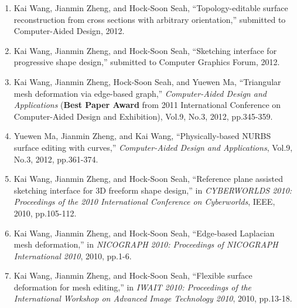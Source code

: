 \begin{enumerate}

\item Kai Wang, Jianmin Zheng, and Hock-Soon Seah,
``Topology-editable surface reconstruction from cross sections with
arbitrary orientation,'' submitted to Computer-Aided Design, 2012.

\item Kai Wang, Jianmin Zheng, and Hock-Soon Seah,
``Sketching interface for progressive shape design,'' submitted to
Computer Graphics Forum, 2012.

\item Kai Wang, Jianmin Zheng, Hock-Soon Seah, and Yuewen
Ma, ``Triangular mesh deformation via edge-based graph,''
\emph{Computer-Aided Design and Applications} ({\bf Best Paper
Award} from 2011 International Conference on Computer-Aided Design
and Exhibition), Vol.9, No.3, 2012, pp.345-359.

\item Yuewen Ma, Jianmin Zheng, and Kai Wang,
``Physically-based NURBS surface editing with curves,''
\emph{Computer-Aided Design and Applications}, Vol.9, No.3, 2012,
pp.361-374.

\item Kai Wang, Jianmin Zheng, and Hock-Soon Seah,
``Reference plane assisted sketching interface for 3D freeform shape
design,'' in \emph{CYBERWORLDS 2010: Proceedings of the 2010
International Conference on Cyberworlds}, IEEE, 2010, pp.105-112.

\item Kai Wang, Jianmin Zheng, and Hock-Soon Seah,
``Edge-based Laplacian mesh deformation,'' in \emph{NICOGRAPH 2010:
Proceedings of NICOGRAPH International 2010}, 2010, pp.1-6.

\item Kai Wang, Jianmin Zheng, and Hock-Soon Seah,
``Flexible surface deformation for mesh editing,'' in \emph{IWAIT
2010: Proceedings of the International Workshop on Advanced Image
Technology 2010}, 2010, pp.13-18.

\end{enumerate}
